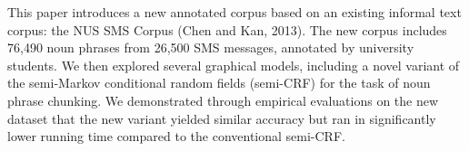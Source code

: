 This paper introduces a new annotated corpus based on an existing informal text corpus: the NUS SMS Corpus (Chen and Kan, 2013). The new corpus includes 76,490 noun phrases from 26,500 SMS messages, annotated by university students. We then explored several graphical models, including a novel variant of the semi-Markov conditional random fields (semi-CRF) for the task of noun phrase chunking. We demonstrated through empirical evaluations on the new dataset that the new variant yielded similar accuracy but ran in significantly lower running time compared to the conventional semi-CRF.
